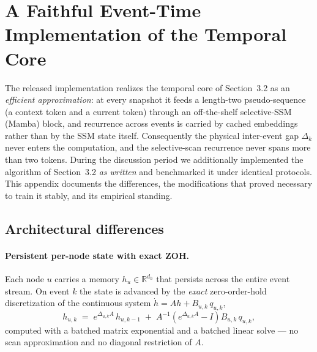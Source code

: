 \section{A Faithful Event-Time Implementation of the Temporal Core}
\label{app:faithful}

The released implementation realizes the temporal core of
Section~3.2 as an \emph{efficient approximation}: at every snapshot it
feeds a length-two pseudo-sequence (a context token and a current
token) through an off-the-shelf selective-SSM (Mamba) block, and
recurrence across events is carried by cached embeddings rather than
by the SSM state itself. Consequently the physical inter-event gap
$\Delta_k$ never enters the computation, and the selective-scan
recurrence never spans more than two tokens. During the discussion
period we additionally implemented the algorithm of Section~3.2
\emph{as written} and benchmarked it under identical protocols. This
appendix documents the differences, the modifications that proved
necessary to train it stably, and its empirical standing.

\subsection{Architectural differences}
\label{app:faithful:arch}

\paragraph{Persistent per-node state with exact ZOH.}
Each node $u$ carries a memory $h_u \in \mathbb{R}^{d_h}$ that
persists across the entire event stream. On event $k$ the state is
advanced by the \emph{exact} zero-order-hold discretization of the
continuous system $\dot h = A h + B_{u,k}\, q_{u,k}$,
\begin{equation}
h_{u,k} \;=\; e^{\Delta_{u,k} A}\, h_{u,k-1}
\;+\; A^{-1}\!\left(e^{\Delta_{u,k} A} - I\right) B_{u,k}\, q_{u,k},
\label{eq:app-zoh}
\end{equation}
computed with a batched matrix exponential and a batched linear
solve --- no scan approximation and no diagonal restriction of $A$.

